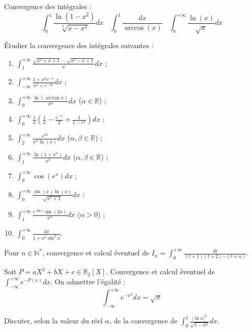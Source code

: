 \documentclass[french,a4paper]{article}
\newcommand{\N}{\mathbb{N}}
\newcommand{\R}{\mathbb{R}}
\newcommand{\st}{^*}
\theoremstyle{plain}
\theoremstyle{definition}
\theoremstyle{remark}
\begin{document}
\begin{ex}[Moulin.IG.23]{}
	Convergence des intégrales : $$\int_{0}^{1}\frac{\ln(1-x^2)}{\sqrt[3]{x-x^2}}dx\ \ \ \ \int_{0}^{1}\frac{dx}{\arccos(x)}\ \ \ \ \int_{0}^{+\infty}\frac{\ln(x)}{\sqrt{x}}dx$$
\end{ex}

\begin{ex}[Moulin.IG.24]{}
	Étudier la convergence des intégrales suivantes :
	\begin{enumerate}[label=(\roman*)]
		\item $\displaystyle\int_{1}^{+\infty}\frac{\sqrt{x^2+x+1}-\sqrt{x^2-x+1}}{x}dx$ ;
		\item $\displaystyle\int_{-\infty}^{+\infty}\frac{1+x^2e^{-x}}{x^2+e^{-2x}}dx$ ;
		\item $\displaystyle\int_{0}^{+\infty}\frac{\ln(\arctan x)}{x^\alpha}dx$ ($\alpha\in\R$) ;
		\item $\displaystyle\int_{0}^{+\infty}\frac{1}{x}\left(\frac{1}{x}-\frac{e^{-x}}{2}+\frac{1}{1-e^x}\right)dx$ ;
		\item $\displaystyle\int_{2}^{+\infty}\frac{e^{\beta x}}{x^\alpha\ln(x)}dx$ ($\alpha,\beta\in\R$) ;
		\item $\displaystyle\int_{1}^{+\infty}\frac{\ln(1+x^\alpha)}{x^\beta}dx$ ($\alpha,\beta\in\R$) ;
		\item $\displaystyle\int_{0}^{+\infty}\cos(e^x)dx$ ;
		\item $\displaystyle\int_{0}^{+\infty}\frac{\sin(x)\ln(x)}{\sqrt{x^2+1}}dx$ ;
		\item $\displaystyle\int_{1}^{+\infty}\frac{e^{\sin x}\sin(2x)}{x^\alpha}dx$ ($\alpha>0$) ;
		\item $\displaystyle\int_{0}^{+\infty}\frac{dx}{1+x^4\sin^2 x}$.
		\end{enumerate}
\end{ex}

\begin{ex}[Moulin.IG.25]{}
	Pour $n\in\N\st$, convergence et calcul éventuel de $I_n=\displaystyle\int_{0}^{+\infty}\frac{dt}{(t+1)(t+2)\cdots(t+n)}$.
\end{ex}

\begin{ex}[Moulin.IG.26]{}
	Soit $P=aX^2+bX+c\in\R_2[X]$. Convergence et calcul éventuel de $\displaystyle\int_{-\infty}^{+\infty}e^{-P(x)}dx$. On admettre l'égalité : $$\int_{-\infty}^{+\infty}e^{-x^2}dx=\sqrt{\pi}$$
\end{ex}

\begin{ex}[Moulin.IG.27]{}
	Discuter, selon la valeur du réel $\alpha$, de la convergence de $\displaystyle\int_{0}^{1}\frac{\lvert\ln x\rvert^\alpha}{\sqrt{1-x^2}}dx$.
\end{ex}
\end{document}
